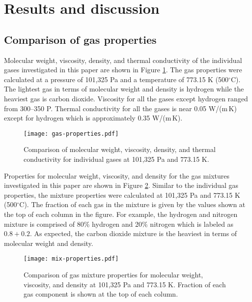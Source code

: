 
\section{Results and discussion}


\subsection{Comparison of gas properties}

Molecular weight, viscosity, density, and thermal conductivity of the individual gases investigated in this paper are shown in Figure \ref{fig:gas-properties}. The gas properties were calculated at a pressure of 101,325 Pa and a temperature of 773.15 K (500$^\circ$C). The lightest gas in terms of molecular weight and density is hydrogen while the heaviest gas is carbon dioxide. Viscosity for all the gases except hydrogen ranged from 300--350 \textmugreek P. Thermal conductivity for all the gases is near 0.05 W/(m\,K) except for hydrogen which is approximately 0.35 W/(m\,K).

\begin{figure}[H]
    \centering
    \texttt{[image: gas-properties.pdf]}
    \caption{Comparison of molecular weight, viscosity, density, and thermal conductivity for individual gases at 101,325 Pa and 773.15 K.}
    \label{fig:gas-properties}
\end{figure}

Properties for molecular weight, viscosity, and density for the gas mixtures investigated in this paper are shown in Figure \ref{fig:mix-properties}. Similar to the individual gas properties, the mixture properties were calculated at 101,325 Pa and 773.15 K (500$^\circ$C). The fraction of each gas in the mixture is given by the values shown at the top of each column in the figure. For example, the hydrogen and nitrogen mixture is comprised of 80\% hydrogen and 20\% nitrogen which is labeled as $0.8 + 0.2$. As expected, the carbon dioxide mixture is the heaviest in terms of molecular weight and density.

\begin{figure}[H]
    \centering
    \texttt{[image: mix-properties.pdf]}
    \caption{Comparison of gas mixture properties for molecular weight, viscosity, and density at 101,325 Pa and 773.15 K. Fraction of each gas component is shown at the top of each column.}
    \label{fig:mix-properties}
\end{figure}

